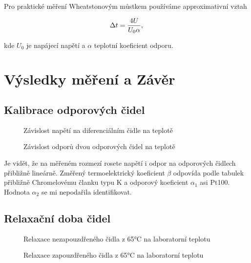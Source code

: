 \documentclass[a4paper,11pt]{article}
\begin{document}
Pro praktické měření Wheatstonovým můstkem používáme approximativní vztah

\begin{equation}
\Delta t = \frac{4U}{U_0 \alpha}, \\
\end{equation}

kde $U_0$ je napájecí napětí a $\alpha$ teplotní koeficient odporu.

\newpage

\section{Výsledky měření a Závěr}

\subsection{Kalibrace odporových čidel}

\begin{figure}[ht]
  \centering
  
  \caption{Závislost napětí na diferenciálním čidle na teplotě}
\end{figure}

\begin{figure}[ht]
  \centering
  
  \caption{Závislost odporů dvou odporových čidel na teplotě}
\end{figure}

Je vidět, že na měřeném rozmezí rosete napětí i odpor na odporových čidlech přibližně lineárně. 
Změřený termoelektrický koeficient $\beta$ odpovída podle tabulek přibližně Chromelovému članku typu K a
odporový koeficient $\alpha_1$ asi Pt100. Hodnota $\alpha_2$ se mi nepodařila identifikovat.

\newpage

\subsection{Relaxační doba čidel}

\begin{figure}[htpb]
  \centering
  
  \caption{Relaxace nezapouzdřeného čidla z 65°C na laboratorní teplotu}
\end{figure}

\begin{figure}[ht]
  \centering
  
  \caption{Relaxace zapouzdřeného čidla z 65°C na laboratorní teplotu}
\end{figure}
\end{document}
